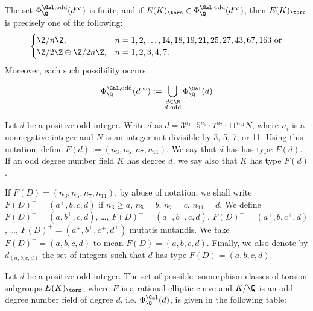 \begin{frame}[plain,c]
\begin{thm}[M.]
The set $\Phi_\Q^{\Gal,\text{odd}}(d^\infty)$ is finite, and if $E(K)_\tors \in \Phi_\Q^{\Gal,\text{odd}}(d^\infty)$, then $E(K)_\tors$ is precisely one of the following:
	\[
	\begin{cases}
	\Z/n\Z, & n= 1, 2, \ldots, 14, 18, 19, 21, 25, 27, 43, 67, 163 \text{ or} \\
	\Z/2\Z \oplus \Z/2n\Z, & n= 1, 2, 3, 4, 7.
	\end{cases}
	\]
Moreover, each such possibility occurs. 
\end{thm}
	\[
	\Phi_\Q^{\Gal,\text{odd}}(d^\infty):= \bigcup_{\substack{d \in \N \\ d \text{ odd}}} \Phi_\Q^{\Gal}(d)
	\]
\end{frame}








\begin{frame}[plain,c]
\footnotesize
\begin{dfn}
Let $d$ be a positive odd integer. Write $d$ as $d= 3^{n_3} \cdot 5^{n_5} \cdot 7^{n_7} \cdot 11^{n_{11}}N$, where $n_i$ is a nonnegative integer and $N$ is an integer not divisible by 3, 5, 7, or 11. Using this notation, define $F(d):= (n_3, n_5, n_7, n_{11})$. We say that $d$ has has type $F(d)$. If an odd degree number field $K$ has degree $d$, we say also that $K$ has type $F(d)$. \pspace

If $F(D)= (n_3, n_5, n_7, n_{11})$, by abuse of notation, we shall write $F(D)^+= (a^+,b,c,d)$ if $n_3 \geq a$, $n_5= b$, $n_7= c$, $n_{11}= d$. We define $F(D)^+= (a,b^+,c,d)$, \dots, $F(D)^+= (a^+,b^+,c,d)$, $F(D)^+= (a^+,b,c^+,d)$, \dots, $F(D)^+= (a^+,b^+,c^+,d^+)$ mutatis mutandis. We take $F(D)^+= (a,b,c,d)$ to mean $F(D)= (a,b,c,d)$. Finally, we also denote by $d_{(a,b,c,d)}$ the set of integers such that $d$ has type $F(D)= (a,b,c,d)$. 
\end{dfn}

\begin{thm}[M.]
Let $d$ be a positive odd integer. The set of possible isomorphism classes of torsion subgroups $E(K)_\tors$, where $E$ is a rational elliptic curve and $K/\Q$ is an odd degree number field of degree $d$, i.e. $\Phi_\Q^{\Gal}(d)$, is given in the following table:
 \end{thm} 
\end{frame}





